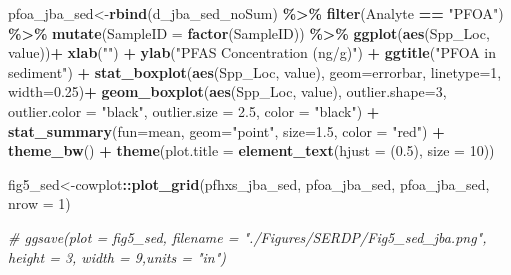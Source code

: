 \documentclass[
]{article}
\newenvironment{Shaded}{\begin{snugshade}}{\end{snugshade}}
\newcommand{\AttributeTok}[1]{\textcolor[rgb]{0.13,0.29,0.53}{#1}}
\newcommand{\CommentTok}[1]{\textcolor[rgb]{0.56,0.35,0.01}{\textit{#1}}}
\newcommand{\DecValTok}[1]{\textcolor[rgb]{0.00,0.00,0.81}{#1}}
\newcommand{\FloatTok}[1]{\textcolor[rgb]{0.00,0.00,0.81}{#1}}
\newcommand{\FunctionTok}[1]{\textcolor[rgb]{0.13,0.29,0.53}{\textbf{#1}}}
\newcommand{\NormalTok}[1]{#1}
\newcommand{\OtherTok}[1]{\textcolor[rgb]{0.56,0.35,0.01}{#1}}
\newcommand{\SpecialCharTok}[1]{\textcolor[rgb]{0.81,0.36,0.00}{\textbf{#1}}}
\newcommand{\StringTok}[1]{\textcolor[rgb]{0.31,0.60,0.02}{#1}}
\begin{document}
\begin{Shaded}
\begin{Highlighting}[]
\NormalTok{pfoa\_jba\_sed}\OtherTok{\textless{}{-}}\FunctionTok{rbind}\NormalTok{(d\_jba\_sed\_noSum) }\SpecialCharTok{\%\textgreater{}\%} 
  \FunctionTok{filter}\NormalTok{(Analyte }\SpecialCharTok{==} \StringTok{"PFOA"}\NormalTok{) }\SpecialCharTok{\%\textgreater{}\%} 
  \FunctionTok{mutate}\NormalTok{(}\AttributeTok{SampleID =} \FunctionTok{factor}\NormalTok{(SampleID)) }\SpecialCharTok{\%\textgreater{}\%} 
  \FunctionTok{ggplot}\NormalTok{(}\FunctionTok{aes}\NormalTok{(Spp\_Loc, value))}\SpecialCharTok{+}
    \FunctionTok{xlab}\NormalTok{(}\StringTok{""}\NormalTok{) }\SpecialCharTok{+}
    \FunctionTok{ylab}\NormalTok{(}\StringTok{"PFAS Concentration (ng/g)"}\NormalTok{) }\SpecialCharTok{+}
    \FunctionTok{ggtitle}\NormalTok{(}\StringTok{"PFOA in sediment"}\NormalTok{) }\SpecialCharTok{+}
    \FunctionTok{stat\_boxplot}\NormalTok{(}\FunctionTok{aes}\NormalTok{(Spp\_Loc, value),}
                 \AttributeTok{geom=}\StringTok{\textquotesingle{}errorbar\textquotesingle{}}\NormalTok{, }\AttributeTok{linetype=}\DecValTok{1}\NormalTok{, }\AttributeTok{width=}\FloatTok{0.25}\NormalTok{)}\SpecialCharTok{+}
    \FunctionTok{geom\_boxplot}\NormalTok{(}\FunctionTok{aes}\NormalTok{(Spp\_Loc, value),}
                 \AttributeTok{outlier.shape=}\DecValTok{3}\NormalTok{,}
                 \AttributeTok{outlier.color =} \StringTok{"black"}\NormalTok{,}
                 \AttributeTok{outlier.size =} \FloatTok{2.5}\NormalTok{,}
                 \AttributeTok{color =} \StringTok{"black"}\NormalTok{) }\SpecialCharTok{+} 
    \FunctionTok{stat\_summary}\NormalTok{(}\AttributeTok{fun=}\NormalTok{mean, }\AttributeTok{geom=}\StringTok{"point"}\NormalTok{, }\AttributeTok{size=}\FloatTok{1.5}\NormalTok{, }\AttributeTok{color =} \StringTok{"red"}\NormalTok{) }\SpecialCharTok{+}
    \FunctionTok{theme\_bw}\NormalTok{() }\SpecialCharTok{+}
    \FunctionTok{theme}\NormalTok{(}\AttributeTok{plot.title =} \FunctionTok{element\_text}\NormalTok{(}\AttributeTok{hjust =}\NormalTok{ (}\FloatTok{0.5}\NormalTok{), }\AttributeTok{size =} \DecValTok{10}\NormalTok{))}

\NormalTok{fig5\_sed}\OtherTok{\textless{}{-}}\NormalTok{cowplot}\SpecialCharTok{::}\FunctionTok{plot\_grid}\NormalTok{(pfhxs\_jba\_sed, pfoa\_jba\_sed, pfoa\_jba\_sed, }
                   \AttributeTok{nrow =} \DecValTok{1}\NormalTok{)}

\CommentTok{\# ggsave(plot = fig5\_sed, filename = "./Figures/SERDP/Fig5\_sed\_jba.png", height = 3, width = 9,units = "in")}
\end{Highlighting}
\end{Shaded}
\end{document}
